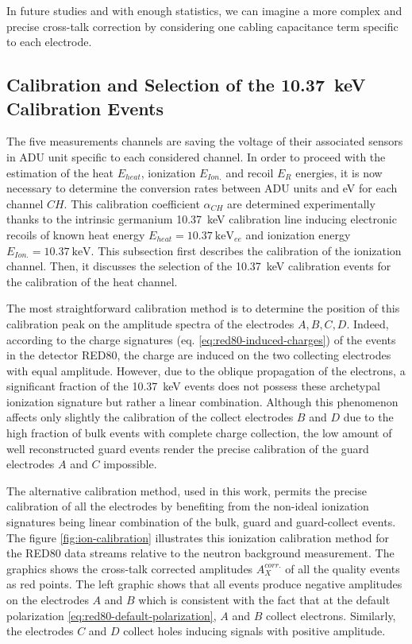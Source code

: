 In future studies and with enough statistics, we can imagine a more complex and precise cross-talk correction by considering one cabling capacitance term specific to each electrode.


\subsection{Calibration and Selection of the \SI{10.37}{\kilo\eV} Calibration Events}
\label{par:ion-calibration}
\label{par:heat-calibration}
\label{par:10kev-selection}

The five measurements channels are saving the voltage of their associated sensors in ADU unit specific to each considered channel. In order to proceed with the estimation of the heat $E_{heat}$, ionization $E_{Ion.}$ and recoil $E_R$ energies, it is now necessary to determine the conversion rates between ADU units and \si{\eV} for each channel $CH$. This calibration coefficient $\alpha_{CH}$ are determined experimentally thanks to the intrinsic germanium \SI{10.37}{\kilo\eV} calibration line inducing electronic recoils of known heat energy $E_{heat} = \SI{10.37}{\kilo\eV_{ee}}$ and ionization energy $E_{Ion.} = \SI{10.37}{\kilo\eV}$. This subsection first describes the calibration of the ionization channel. Then, it discusses the selection of the \SI{10.37}{\kilo\eV} calibration events for the calibration of the heat channel.

The most straightforward calibration method is to determine the position of this calibration peak on the amplitude spectra of the electrodes $A,B,C,D$. Indeed, according to the charge signatures (eq. \ref{eq:red80-induced-charges}) of the events in the detector RED80, the charge are induced on the two collecting electrodes with equal amplitude. However, due to the oblique propagation of the electrons, a significant fraction of the \SI{10.37}{\kilo\eV} events does not possess these archetypal ionization signature but rather a linear combination. Although this phenomenon affects only slightly the calibration of the collect electrodes $B$ and $D$ due to the high fraction of bulk events with complete charge collection, the low amount of well reconstructed guard events render the precise calibration of the guard electrodes $A$ and $C$ impossible. 

The alternative calibration method, used in this work, permits the precise calibration of all the electrodes by benefiting from the non-ideal ionization signatures being linear combination of the bulk, guard and guard-collect events. The figure \ref{fig:ion-calibration} illustrates this ionization calibration method for the RED80 data streams relative to the neutron background measurement. The graphics shows the cross-talk corrected amplitudes $A_X^{corr.}$ of all the quality events as red points. The left graphic shows that all events produce negative amplitudes on the electrodes $A$ and $B$ which is consistent with the fact that at the default polarization \ref{eq:red80-default-polarization}, $A$ and $B$ collect electrons. Similarly, the electrodes $C$ and $D$ collect holes inducing signals with positive amplitude.

